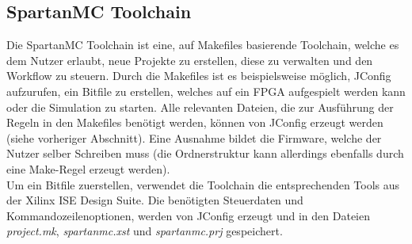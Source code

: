 \subsection{SpartanMC Toolchain}
Die SpartanMC Toolchain ist eine, auf Makefiles basierende Toolchain, welche es dem Nutzer erlaubt, neue Projekte zu erstellen, diese zu
verwalten und den Workflow zu steuern. Durch die Makefiles ist es beispielsweise möglich, JConfig aufzurufen, ein Bitfile zu erstellen, welches
auf ein FPGA aufgespielt werden kann oder die Simulation zu starten. Alle relevanten Dateien, die zur Ausführung der Regeln in den Makefiles benötigt 
werden, können von JConfig erzeugt werden (siehe vorheriger Abschnitt). Eine Ausnahme bildet die Firmware, welche der Nutzer selber Schreiben muss (die
Ordnerstruktur kann allerdings ebenfalls durch eine Make-Regel erzeugt werden).\\
Um ein Bitfile zuerstellen, verwendet die Toolchain die entsprechenden Tools aus der Xilinx ISE Design Suite. Die benötigten Steuerdaten und Kommandozeilenoptionen,
werden von JConfig erzeugt und in den Dateien \textit{project.mk}, \textit{spartanmc.xst} und \textit{spartanmc.prj} gespeichert.

